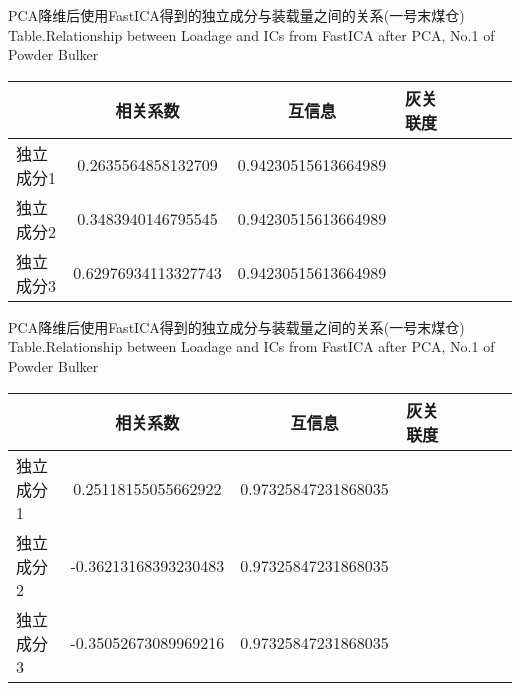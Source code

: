 \begin{table}[!h]
\begin{center}
		{PCA降维后使用FastICA得到的独立成分与装载量之间的关系(一号末煤仓)}
			{Table.}{Relationship between Loadage and ICs from FastICA after PCA, No.1 of Powder Bulker}
\begin{tabular}{lccclccc}
\toprule
                		& 相关系数     					& 互信息      						&灰关联度 \\
\midrule
  独立成分1     	&  0.2635564858132709     		& 0.94230515613664989   		&    \\
  独立成分2     	&  0.3483940146795545			& 0.94230515613664989  		&    \\
  独立成分3     	&  0.62976934113327743			& 0.94230515613664989			&    \\
 \bottomrule
\end{tabular}
\end{center}
\end{table}

\begin{table}[!h]
\begin{center}
		{PCA降维后使用FastICA得到的独立成分与装载量之间的关系(一号末煤仓)}
			{Table.}{Relationship between Loadage and ICs from FastICA after PCA, No.1 of Powder Bulker}
\begin{tabular}{lccclccc}
\toprule
                		& 相关系数     					& 互信息      						&灰关联度 \\
\midrule
  独立成分1     	&  0.25118155055662922     		& 0.97325847231868035   		&    \\
  独立成分2     	&  -0.36213168393230483		& 0.97325847231868035  		&    \\
  独立成分3     	&  -0.35052673089969216		& 0.97325847231868035			&    \\
 \bottomrule
\end{tabular}
\end{center}
\end{table}

